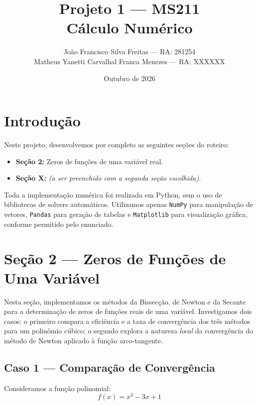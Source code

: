\documentclass[12pt, a4paper]{article}
\title{Projeto 1 --- MS211 \\[0.3cm]
\large Cálculo Numérico}
\author{
    João Francisco Silva Freitas --- RA: 281254 \\
    Matheus Yanetti Carvalhal Franca Menezes --- RA: XXXXXX\\
}
\date{Outubro de 2026}
\begin{document}
\maketitle

\section*{Introdução}

Neste projeto, desenvolvemos por completo as seguintes seções do roteiro:

\begin{itemize}
    \item \textbf{Seção 2:} Zeros de funções de uma variável real.
    \item \textbf{Seção X:} \textit{(a ser preenchido com a segunda seção escolhida)}.
\end{itemize}

Toda a implementação numérica foi realizada em Python, sem o uso de bibliotecas de solvers automáticos.
Utilizamos apenas \texttt{NumPy} para manipulação de vetores, \texttt{Pandas} para geração de tabelas e \texttt{Matplotlib} para visualização gráfica, conforme permitido pelo enunciado.


\newpage
\section{Seção 2 --- Zeros de Funções de Uma Variável}

Nesta seção, implementamos os métodos da Bissecção, de Newton e da Secante para a determinação de zeros de funções reais de uma variável. Investigamos dois casos: o primeiro compara a eficiência e a taxa de convergência dos três métodos para um polinômio cúbico; o segundo explora a natureza \emph{local} da convergência do método de Newton aplicado à função arco-tangente.


\subsection{Caso 1 --- Comparação de Convergência}

Consideramos a função polinomial:
\begin{equation}
    f(x) = x^3 - 3x + 1
\end{equation}
\end{document}
